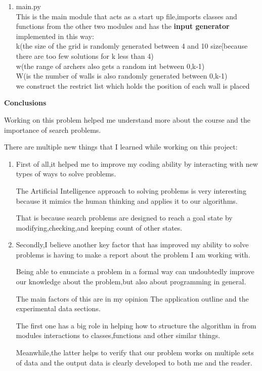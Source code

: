 \documentclass{article}
\begin{document}
\begin{enumerate}
\begin{itemize}
  \end{itemize}
  \item main.py
  \\This is the main module that acts as a start up file,imports classes and functions from the other two modules and has the \textbf{input generator} implemented in this way:
  \\k(the size of the grid is randomly generated between 4 and 10 size[because there are too few solutions for k less than 4)
  \\w(the range of archers also gets a random int between 0,k-1)
  \\W(is the number of walls is also randomly generated between 0,k-1)
  \\we construct the restrict list which holds the position of each wall is placed
  
  
  \newpage
 
  
\end{enumerate}
\newpage

\par \textbf{Conclusions}
\par Working on this problem helped me understand more about the course and the importance of search problems.
\par There are multiple new things that I learned while working on this project:
\begin{enumerate}
    \item First of all,it helped me to improve my coding ability by interacting with new types of ways to solve problems.
    \par The Artificial Intelligence approach to solving problems is very interesting because it mimics the human thinking and applies it to our algorithms.
    \par That is because search problems are designed to reach a  goal state by modifying,checking,and keeping count of other states.
    \item Secondly,I believe another key factor that has improved my ability to solve problems is having to make a report about the problem I am working with.
    \par Being able to enunciate a problem in a formal way can undoubtedly improve our knowledge about the problem,but also about programming in general.
    \par The main factors of this are in my opinion The application outline and the experimental data sections.
    \par The first one has a big role in helping how to structure the algorithm in from modules interactions to classes,functions and other similar things.
    \par Meanwhile,the latter helps to verify that our problem works on multiple sets of data and the output data is clearly developed to both me and the reader.
\end{enumerate}
\newpage
\end{document}
